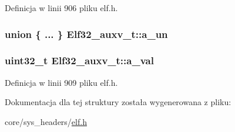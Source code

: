 Definicja w linii 906 pliku elf.\-h.

\hypertarget{struct_elf32__auxv__t_afe17fc70719136f46462ccd117875236}{
\subsubsection[{a\-\_\-un}]{\setlength{\rightskip}{0pt plus 5cm}union \{ ... \}   Elf32\-\_\-auxv\-\_\-t\-::a\-\_\-un}}\label{struct_elf32__auxv__t_afe17fc70719136f46462ccd117875236}
\hypertarget{struct_elf32__auxv__t_a527cb12aa61f2b93e67e72b2d9bb6312}{
\subsubsection[{a\-\_\-val}]{\setlength{\rightskip}{0pt plus 5cm}uint32\-\_\-t Elf32\-\_\-auxv\-\_\-t\-::a\-\_\-val}}\label{struct_elf32__auxv__t_a527cb12aa61f2b93e67e72b2d9bb6312}


Definicja w linii 909 pliku elf.\-h.



Dokumentacja dla tej struktury została wygenerowana z pliku\-:\begin{DoxyCompactItemize}
\item 
core/sys\-\_\-headers/\hyperlink{elf_8h}{elf.\-h}\end{DoxyCompactItemize}
